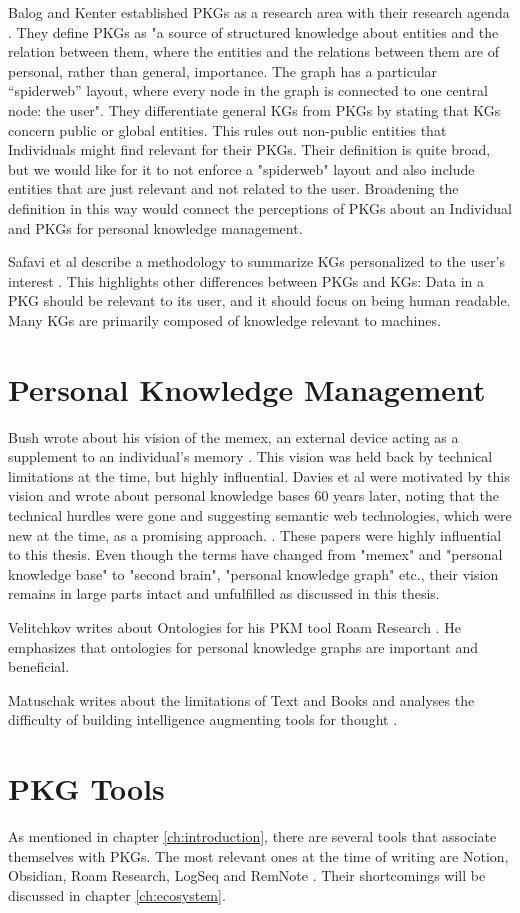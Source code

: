 Balog and Kenter established PKGs as a research area with their research agenda \cite{Balog2019PKGAgenda}. They define PKGs as "a source of structured knowledge about entities and the relation between them, where the entities and the relations between them are of personal, rather than general, importance. The graph has a particular “spiderweb” layout, where every node in the graph is connected to one central node: the user". They differentiate general KGs from PKGs by stating that KGs concern public or global entities. This rules out non-public entities that Individuals might find relevant for their PKGs. Their definition is quite broad, but we would like for it to not enforce a "spiderweb" layout and also include entities that are just relevant and not related to the user. Broadening the definition in this way would connect the perceptions of PKGs about an Individual and PKGs for personal knowledge management.

Safavi et al describe a methodology to summarize KGs personalized to the user's interest \cite{Safavi2019PKGSum}. This highlights other differences between PKGs and KGs: Data in a PKG should be relevant to its user, and it should focus on being human readable. Many KGs are primarily composed of knowledge relevant to machines.
    

\section{Personal Knowledge Management}
Bush wrote about his vision of the memex, an external device acting as a  supplement to an individual's memory \cite{Bush1945Memex}. This vision was held back by technical limitations at the time, but highly influential. Davies et al were motivated by this vision and wrote about personal knowledge bases 60 years later, noting that the technical hurdles were gone and suggesting semantic web technologies, which were new at the time, as a promising approach. \cite{Davies2005Memex60}. These papers were highly influential to this thesis. Even though the terms have changed from "memex" and "personal knowledge base" to "second brain", "personal knowledge graph" etc., their vision remains in large parts intact and unfulfilled as discussed in this thesis.

Velitchkov writes about Ontologies for his PKM tool Roam Research \cite{roamOntologies}. He emphasizes that ontologies for personal knowledge graphs are important and beneficial.

Matuschak writes about the limitations of Text and Books and analyses the difficulty of building intelligence augmenting tools for thought \cite{Matuschak2019TTFT}.

\section{PKG Tools}

As mentioned in chapter \ref{ch:introduction}, there are several tools that associate themselves with PKGs. The most relevant ones at the time of writing are Notion, Obsidian, Roam Research, LogSeq and RemNote \cite{notion, roam, obsidian, logseq, remnote}. Their shortcomings will be discussed in chapter \ref{ch:ecosystem}.